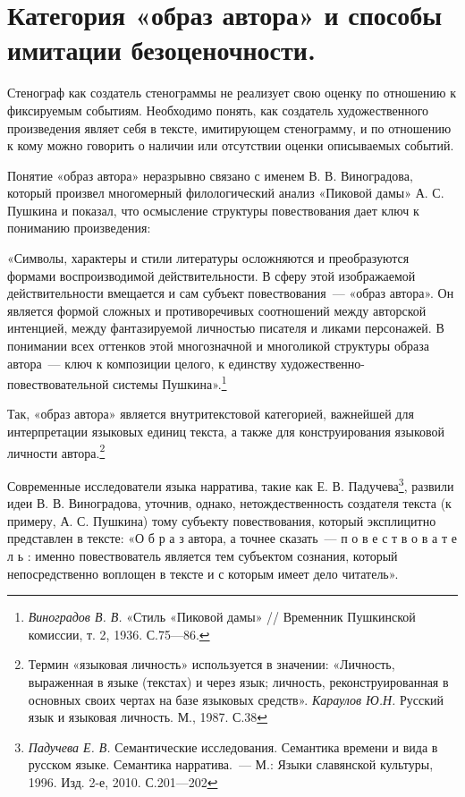 \documentclass{kursa4}
\begin{document}
{    \section{Категория «образ автора» и способы
    имитации безоценочности.}

      Стенограф как создатель стенограммы не реализует свою оценку по
      отношению к фиксируемым событиям. Необходимо понять, как создатель
      художественного произведения являет себя в тексте, имитирующем
      стенограмму, и по отношению к кому можно говорить о наличии или
      отсутствии оценки описываемых событий. 

      Понятие «образ автора» неразрывно связано с именем В. В.
      Виноградова, который произвел многомерный филологический анализ
      «Пиковой дамы» А. С. Пушкина и показал, что осмысление структуры
      повествования дает ключ к пониманию произведения:

      «Символы, характеры и стили литературы осложняются и преобразуются
      формами воспроизводимой действительности. В сферу этой изображаемой
      действительности вмещается и сам субъект повествования~--- «образ
      автора». Он является формой сложных и противоречивых соотношений между
      авторской интенцией, между фантазируемой личностью писателя и ликами
      персонажей. В понимании всех оттенков этой многозначной и многоликой
      структуры образа автора~--- ключ к композиции целого, к единству
      художественно-повествовательной системы
      Пушкина».\footnote{\textit{{Виноградов В. В.
      }}{«Стиль «Пиковой дамы» // Временник Пушкинской
      комиссии, т. 2, 1936. С.75—86.}} 

      Так, «образ автора» является внутритекстовой категорией, важнейшей
      для интерпретации языковых единиц текста, а также для конструирования
      языковой личности автора.\footnote{{Термин «языковая
      личность» используется в значении: «Личность, выраженная в языке
      (текстах) и через язык; личность, реконструированная в основных своих
      чертах на базе языковых средств». }\textit{{Караулов
      Ю.Н. }}{Русский язык и языковая личность. М., 1987.
      С.38}} 

      Современные исследователи языка нарратива, такие как Е. В.
      Падучева\footnote{\textit{{Падучева Е. В.
      }}{Семантические исследования. Семантика времени и
      вида в русском языке. Семантика нарратива.~--- М.: Языки славянской
      культуры, 1996. Изд. 2-е, 2010. С.201—202}}, развили идеи В. В. Виноградова, уточнив, однако,
      нетождественность создателя текста (к примеру, А. С. Пушкина) тому
      субъекту повествования, который эксплицитно представлен в
      тексте:\newline
      «О б р а з автора, а точнее сказать~--- п о в е с т в о в а т е л ь :
      именно повествователь является тем субъектом сознания, который
      непосредственно воплощен в тексте и с которым имеет дело читатель». 

}
\end{document}
